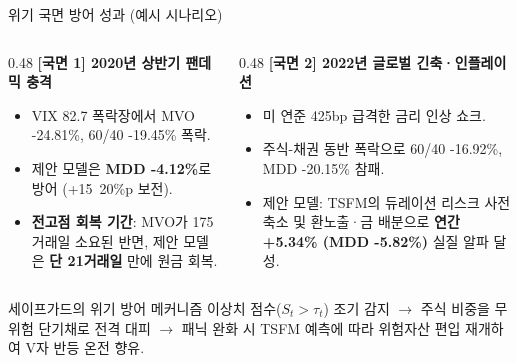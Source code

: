 \begin{frame}{위기 국면 방어 성과 (예시 시나리오)}
\begin{columns}[T]
  \begin{column}{0.48\textwidth}
    \textbf{[국면 1] 2020년 상반기 팬데믹 충격}
    \begin{itemize}
      \setlength{\itemsep}{3pt}
      \small
      \item VIX 82.7 폭락장에서 MVO -24.81\%, 60/40 -19.45\% 폭락.
      \item 제안 모델은 \textbf{MDD -4.12\%}로 방어 (+15~20\%p 보전).
      \item \textbf{전고점 회복 기간}: MVO가 175거래일 소요된 반면, 제안 모델은 \textbf{단 21거래일} 만에 원금 회복.
    \end{itemize}
  \end{column}
  
  \begin{column}{0.48\textwidth}
    \textbf{[국면 2] 2022년 글로벌 긴축·인플레이션}
    \begin{itemize}
      \setlength{\itemsep}{3pt}
      \small
      \item 미 연준 425bp 급격한 금리 인상 쇼크.
      \item 주식-채권 동반 폭락으로 60/40 -16.92\%, MDD -20.15\% 참패.
      \item 제안 모델: TSFM의 듀레이션 리스크 사전 축소 및 환노출·금 배분으로 \textbf{연간 +5.34\% (MDD -5.82\%)} 실질 알파 달성.
    \end{itemize}
  \end{column}
\end{columns}

\vspace{3mm}
\begin{exampleblock}{세이프가드의 위기 방어 메커니즘}
  \small 이상치 점수($S_t > \tau_t$) 조기 감지 $\rightarrow$ 주식 비중을 무위험 단기채로 전격 대피 $\rightarrow$ 패닉 완화 시 TSFM 예측에 따라 위험자산 편입 재개하여 V자 반등 온전 향유.
\end{exampleblock}
\scenarionote
\end{frame}

